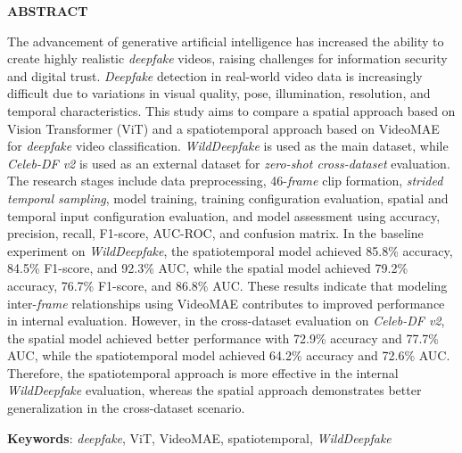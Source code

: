 \clearpage
{}%
\thispagestyle{fancy}

\begin{center}
	\large \bfseries \MakeUppercase{Abstract}\\
	\bigskip
	
	\normalsize \normalfont \justifying \singlespacing
	The advancement of generative artificial intelligence has increased the ability to create highly realistic \textit{deepfake} videos, raising challenges for information security and digital trust. \textit{Deepfake} detection in real-world video data is increasingly difficult due to variations in visual quality, pose, illumination, resolution, and temporal characteristics. This study aims to compare a spatial approach based on Vision Transformer (ViT) and a spatiotemporal approach based on VideoMAE for \textit{deepfake} video classification. \textit{WildDeepfake} is used as the main dataset, while \textit{Celeb-DF v2} is used as an external dataset for \textit{zero-shot cross-dataset} evaluation. The research stages include data preprocessing, 46-\textit{frame} clip formation, \textit{strided temporal sampling}, model training, training configuration evaluation, spatial and temporal input configuration evaluation, and model assessment using accuracy, precision, recall, F1-score, AUC-ROC, and confusion matrix. In the baseline experiment on \textit{WildDeepfake}, the spatiotemporal model achieved 85.8\% accuracy, 84.5\% F1-score, and 92.3\% AUC, while the spatial model achieved 79.2\% accuracy, 76.7\% F1-score, and 86.8\% AUC. These results indicate that modeling inter-\textit{frame} relationships using VideoMAE contributes to improved performance in internal evaluation. However, in the cross-dataset evaluation on \textit{Celeb-DF v2}, the spatial model achieved better performance with 72.9\% accuracy and 77.7\% AUC, while the spatiotemporal model achieved 64.2\% accuracy and 72.6\% AUC. Therefore, the spatiotemporal approach is more effective in the internal \textit{WildDeepfake} evaluation, whereas the spatial approach demonstrates better generalization in the cross-dataset scenario.\par
    
    \vspace{20pt}
	\raggedright\textbf{Keywords}: \textit{deepfake}, ViT, VideoMAE, spatiotemporal, \textit{WildDeepfake}
	
	\vfill
	
\end{center}
\clearpage
